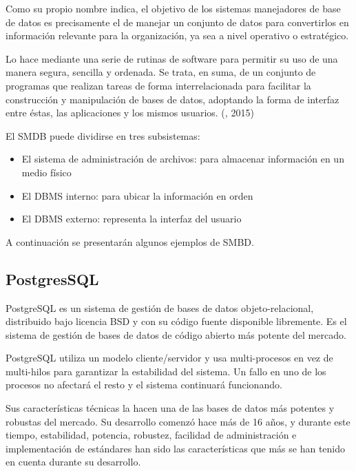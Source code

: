 Como su propio nombre indica, el objetivo de los sistemas manejadores de base de datos es precisamente el de manejar un conjunto de datos para convertirlos en información relevante para la organización, ya sea a nivel operativo o estratégico.
 
Lo hace mediante una serie de rutinas de software para permitir su uso de una manera segura, sencilla y ordenada. Se trata, en suma, de un conjunto de programas que realizan tareas de forma interrelacionada para facilitar la construcción y manipulación de bases de datos, adoptando la forma de interfaz entre éstas, las aplicaciones y los mismos usuarios. (\citet{smdbbib}, 2015)

El SMDB puede dividirse en tres subsistemas:
\setlength{\parskip}{0mm}
\begin{itemize}

    \item El sistema de administración de archivos: para almacenar información en un medio físico
    
    \item El DBMS interno: para ubicar la información en orden
    
    \item El DBMS externo: representa la interfaz del usuario

\end{itemize}



\setlength{\parskip}{5mm}
A continuación se presentarán algunos ejemplos de SMBD.
\setlength{\parskip}{0mm}

\subsection {PostgresSQL}
\setlength{\parskip}{5mm}
PostgreSQL es un sistema de gestión de bases de datos objeto-relacional, distribuido bajo licencia BSD y con su código fuente disponible libremente. Es el sistema de gestión de bases de datos de código abierto más potente del mercado.

PostgreSQL utiliza un modelo cliente/servidor y usa multi-procesos en vez de multi-hilos para garantizar la estabilidad del sistema. Un fallo en uno de los procesos no afectará el resto y el sistema continuará funcionando.

Sus características técnicas la hacen una de las bases de datos más potentes y robustas del mercado. Su desarrollo comenzó hace más de 16 años, y durante este tiempo, estabilidad, potencia, robustez, facilidad de administración e implementación de estándares han sido las características que más se han tenido en cuenta durante su desarrollo.

